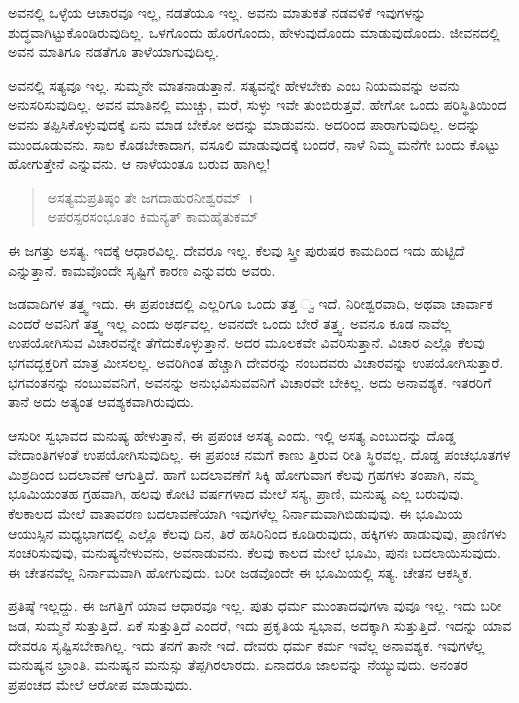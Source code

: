 ಅವನಲ್ಲಿ ಒಳ್ಳೆಯ ಆಚಾರವೂ ಇಲ್ಲ, ನಡತೆಯೂ ಇಲ್ಲ. ಅವನು ಮಾತುಕತೆ ನಡವಳಿಕೆ ಇವುಗಳನ್ನು ಶುದ್ಧವಾಗಿಟ್ಟುಕೊಂಡಿರುವುದಿಲ್ಲ. ಒಳಗೊಂದು ಹೊರಗೊಂದು, ಹೇಳುವುದೊಂದು ಮಾಡುವುದೊಂದು. ಜೀವನದಲ್ಲಿ ಅವನ ಮಾತಿಗೂ ನಡತೆಗೂ ತಾಳೆಯಾಗುವುದಿಲ್ಲ.

ಅವನಲ್ಲಿ ಸತ್ಯವೂ ಇಲ್ಲ. ಸುಮ್ಮನೇ ಮಾತನಾಡುತ್ತಾನೆ. ಸತ್ಯವನ್ನೇ ಹೇಳಬೇಕು ಎಂಬ ನಿಯಮವನ್ನು ಅವನು ಅನುಸರಿಸುವುದಿಲ್ಲ. ಅವನ ಮಾತಿನಲ್ಲಿ ಮುಚ್ಚು, ಮರೆ, ಸುಳ್ಳು ಇವೇ ತುಂಬಿರುತ್ತವೆ. ಹೇಗೋ ಒಂದು ಪರಿಸ್ಥಿತಿಯಿಂದ ಅವನು ತಪ್ಪಿಸಿಕೊಳ್ಳುವುದಕ್ಕೆ ಏನು ಮಾಡ ಬೇಕೋ ಅದನ್ನು ಮಾಡುವನು. ಅದರಿಂದ ಪಾರಾಗುವುದಿಲ್ಲ. ಅದನ್ನು ಮುಂದೂಡುವನು. ಸಾಲ ಕೊಡಬೇಕಾದಾಗ, ವಸೂಲಿ ಮಾಡುವುದಕ್ಕೆ ಬಂದರೆ, ನಾಳೆ ನಿಮ್ಮ ಮನೆಗೇ ಬಂದು ಕೊಟ್ಟು ಹೋಗುತ್ತೇನೆ ಎನ್ನುವನು. ಆ ನಾಳೆಯಂತೂ ಬರುವ ಹಾಗಿಲ್ಲ!

\begin{verse}
ಅಸತ್ಯಮಪ್ರತಿಷ್ಠಂ ತೇ ಜಗದಾಹುರನೀಶ್ವರಮ್~।\\ಅಪರಸ್ಪರಸಂಭೂತಂ ಕಿಮನ್ಯತ್ ಕಾಮಹೈತುಕಮ್ 
\end{verse}

{\small ಈ ಜಗತ್ತು ಅಸತ್ಯ. ಇದಕ್ಕೆ ಆಧಾರವಿಲ್ಲ. ದೇವರೂ ಇಲ್ಲ. ಕೆಲವು ಸ್ತ್ರೀ ಪುರುಷರ ಕಾಮದಿಂದ ಇದು ಹುಟ್ಟಿದೆ ಎನ್ನುತ್ತಾನೆ. ಕಾಮವೊಂದೇ ಸೃಷ್ಟಿಗೆ ಕಾರಣ ಎನ್ನುವರು ಅವರು.}

ಜಡವಾದಿಗಳ ತತ್ತ್ವ ಇದು. ಈ ಪ್ರಪಂಚದಲ್ಲಿ ಎಲ್ಲರಿಗೂ ಒಂದು ತತ್ತ ್ವ ಇದೆ. ನಿರೀಶ್ವರವಾದಿ, ಅಥವಾ ಚಾರ್ವಾಕ ಎಂದರೆ ಅವನಿಗೆ ತತ್ತ್ವ ಇಲ್ಲ ಎಂದು ಅರ್ಥವಲ್ಲ. ಅವನದೇ ಒಂದು ಬೇರೆ ತತ್ತ್ವ. ಅವನೂ ಕೂಡ ನಾವೆಲ್ಲ ಉಪಯೋಗಿಸುವ ವಿಚಾರವನ್ನೇ ತೆಗೆದುಕೊಳ್ಳುತ್ತಾನೆ. ಅದರ ಮೂಲಕವೇ ವಿವರಿಸುತ್ತಾನೆ. ವಿಚಾರ ಎಲ್ಲೊ ಕೆಲವು ಭಗವದ್ಭಕ್ತರಿಗೆ ಮಾತ್ರ ಮೀಸಲಲ್ಲ. ಅವರಿಗಿಂತ ಹೆಚ್ಚಾಗಿ ದೇವರನ್ನು ನಂಬದವರು ವಿಚಾರವನ್ನು ಉಪಯೋಗಿಸುತ್ತಾರೆ. ಭಗವಂತನನ್ನು ನಂಬುವವನಿಗೆ, ಅವನನ್ನು ಅನುಭವಿಸುವವನಿಗೆ ವಿಚಾರವೇ ಬೇಕಿಲ್ಲ. ಅದು ಅನಾವಶ್ಯಕ. ಇತರರಿಗೆ ತಾನೆ ಅದು ಅತ್ಯಂತ ಆವಶ್ಯಕವಾಗಿರುವುದು.

ಆಸುರೀ ಸ್ವಭಾವದ ಮನುಷ್ಯ ಹೇಳುತ್ತಾನೆ, ಈ ಪ್ರಪಂಚ ಅಸತ್ಯ ಎಂದು. ಇಲ್ಲಿ ಅಸತ್ಯ ಎಂಬುದನ್ನು ದೊಡ್ಡ ವೇದಾಂತಿಗಳಂತೆ ಉಪಯೋಗಿಸುವುದಿಲ್ಲ. ಈ ಪ್ರಪಂಚ ನಮಗೆ ಕಾಣು ತ್ತಿರುವ ರೀತಿ ಸ್ಥಿರವಲ್ಲ. ದೊಡ್ಡ ಪಂಚಭೂತಗಳ ಮಿಶ್ರದಿಂದ ಬದಲಾವಣೆ ಆಗುತ್ತಿದೆ. ಹಾಗೆ ಬದಲಾವಣೆಗೆ ಸಿಕ್ಕಿ ಹೋಗುವಾಗ ಕೆಲವು ಗ್ರಹಗಳು ತಂಪಾಗಿ, ನಮ್ಮ ಭೂಮಿಯಂತಹ ಗ್ರಹವಾಗಿ, ಹಲವು ಕೋಟಿ ವರ್ಷಗಳಾದ ಮೇಲೆ ಸಸ್ಯ, ಪ್ರಾಣಿ, ಮನುಷ್ಯ ಎಲ್ಲ ಬರುವುವು. ಕೆಲಕಾಲದ ಮೇಲೆ ವಾತಾವರಣ ಬದಲಾವಣೆಯಾಗಿ ಇವುಗಳೆಲ್ಲ ನಿರ್ನಾಮವಾಗಿಬಿಡುವುವು. ಈ ಭೂಮಿಯ ಆಯುಸ್ಸಿನ ಮಧ್ಯಭಾಗದಲ್ಲಿ ಎಲ್ಲೊ ಕೆಲವು ದಿನ, ತಿರೆ ಹಸಿರಿನಿಂದ ಕೂಡಿರುವುದು, ಹಕ್ಕಿಗಳು ಹಾಡುವುವು, ಪ್ರಾಣಿಗಳು ಸಂಚರಿಸುವುವು, ಮನುಷ್ಯನೇಳುವನು, ಅವನಾಡುವನು. ಕೆಲವು ಕಾಲದ ಮೇಲೆ ಭೂಮಿ, ಪುನಃ ಬದಲಾಯಿಸುವುದು. ಈ ಚೇತನವೆಲ್ಲ ನಿರ್ನಾಮವಾಗಿ ಹೋಗುವುದು. ಬರೀ ಜಡವೊಂದೇ ಈ ಭೂಮಿಯಲ್ಲಿ ಸತ್ಯ. ಚೇತನ ಆಕಸ್ಮಿಕ.

ಪ್ರತಿಷ್ಠೆ ಇಲ್ಲದ್ದು. ಈ ಜಗತ್ತಿಗೆ ಯಾವ ಆಧಾರವೂ ಇಲ್ಲ. ಪುತು ಧರ್ಮ ಮುಂತಾದವುಗಳಾ ವುವೂ ಇಲ್ಲ. ಇದು ಬರೀ ಜಡ, ಸುಮ್ಮನೆ ಸುತ್ತುತ್ತಿದೆ. ಏಕೆ ಸುತ್ತುತ್ತಿದೆ ಎಂದರೆ, ಇದು ಪ್ರಕೃತಿಯ ಸ್ವಭಾವ, ಅದಕ್ಕಾಗಿ ಸುತ್ತುತ್ತಿದೆ. ಇದನ್ನು ಯಾವ ದೇವರೂ ಸೃಷ್ಟಿಸಬೇಕಾಗಿಲ್ಲ. ಇದು ತನಗೆ ತಾನೇ ಇದೆ. ದೇವರು ಧರ್ಮ ಕರ್ಮ ಇವೆಲ್ಲ ಅನಾವಶ್ಯಕ. ಇವುಗಳೆಲ್ಲ ಮನುಷ್ಯನ ಭ್ರಾಂತಿ. ಮನುಷ್ಯನ ಮನುಸ್ಸು ತೆಪ್ಪಗಿರಲಾರದು. ಏನಾದರೂ ಜಾಲವನ್ನು ನೆಯ್ಯುವುದು. ಅನಂತರ ಪ್ರಪಂಚದ ಮೇಲೆ ಆರೋಪ ಮಾಡುವುದು.

